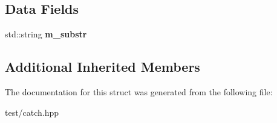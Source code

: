 \subsection*{Data Fields}
\begin{DoxyCompactItemize}
\item 
std\+::string {\bfseries m\+\_\+substr}\hypertarget{structCatch_1_1Matchers_1_1Impl_1_1StdString_1_1StartsWith_aebcdf35b98fd0097d9e9113b9219fcd1}{}\label{structCatch_1_1Matchers_1_1Impl_1_1StdString_1_1StartsWith_aebcdf35b98fd0097d9e9113b9219fcd1}

\end{DoxyCompactItemize}
\subsection*{Additional Inherited Members}


The documentation for this struct was generated from the following file\+:\begin{DoxyCompactItemize}
\item 
test/catch.\+hpp\end{DoxyCompactItemize}
